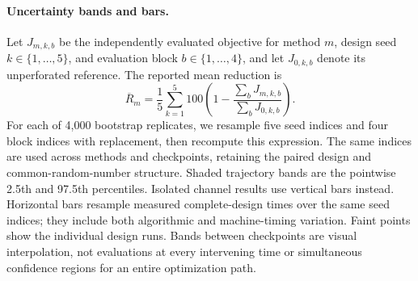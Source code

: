 \paragraph{Uncertainty bands and bars.}
Let $J_{m,k,b}$ be the independently evaluated objective for method $m$,
design seed $k\in\{1,\ldots,5\}$, and evaluation block
$b\in\{1,\ldots,4\}$, and let $J_{0,k,b}$ denote its unperforated reference.
The reported mean reduction is
\[
 \overline R_m=\frac15\sum_{k=1}^5
 100\left(1-\frac{\sum_b J_{m,k,b}}{\sum_b J_{0,k,b}}\right).
\]
For each of 4,000 bootstrap replicates, we resample five seed indices and four
block indices with replacement, then recompute this expression. The same indices
are used across methods and checkpoints, retaining the paired design and
common-random-number structure. Shaded trajectory bands are the pointwise
2.5th and 97.5th percentiles. Isolated channel results use vertical bars instead.
Horizontal bars resample measured complete-design times over the same seed
indices; they include both algorithmic and machine-timing variation. Faint
points show the individual design runs. Bands between checkpoints are visual
interpolation, not evaluations at every intervening time or simultaneous
confidence regions for an entire optimization path.

